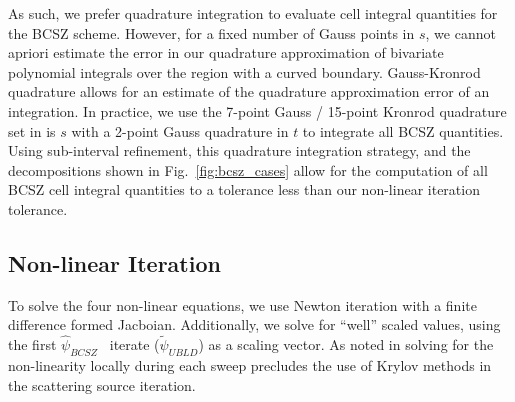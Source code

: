 \documentclass{mc2015}
\newcommand{\fig}[1]{Fig.~\ref{#1}}                      %
\newcommand{\BCSZH}{\ensuremath{\widehat{\psi}_{BCSZ}}}
\begin{document}
As such, we prefer quadrature integration to evaluate cell integral quantities for the BCSZ scheme.
However, for a fixed number of Gauss points in $s$, we cannot apriori estimate the error in our quadrature approximation of bivariate polynomial integrals over the region with a curved boundary.
Gauss-Kronrod quadrature \cite{gk_quad} allows for an estimate of the quadrature approximation error of an integration.
In practice, we use the 7-point Gauss / 15-point Kronrod quadrature set in is $s$ with a 2-point Gauss quadrature in $t$ to integrate all BCSZ quantities.
Using  sub-interval refinement, this quadrature integration strategy, and the decompositions shown in \fig{fig:bcsz_cases} allow for the computation of all BCSZ cell integral quantities to a tolerance less than our non-linear iteration tolerance.

\subsection{Non-linear Iteration}
To solve the four non-linear equations, we use Newton iteration with a finite difference formed Jacboian.
Additionally, we solve for ``well'' scaled values, using the first \BCSZH~ iterate ($\widetilde{\psi}_{UBLD}$) as a scaling vector.
As noted in \cite{csz_me,csz_don} solving for the non-linearity locally during each sweep precludes the use of Krylov methods in the scattering source iteration.
\end{document}
